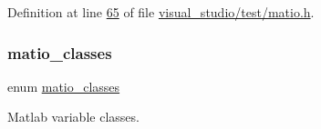 Definition at line \hyperlink{visual__studio_2test_2matio_8h_source_l00065}{65} of file \hyperlink{visual__studio_2test_2matio_8h_source}{visual\+\_\+studio/test/matio.\+h}.

\mbox{\label{group___m_a_t_gad4d60ae7b709fc81bfd744fb4c857c40}} 
\subsubsection{\texorpdfstring{matio\+\_\+classes}{matio\_classes}\hspace{0.1cm}{\footnotesize\ttfamily [1/2]}}
{\footnotesize\ttfamily enum \hyperlink{group___m_a_t_gad4d60ae7b709fc81bfd744fb4c857c40}{matio\+\_\+classes}}



Matlab variable classes. 

